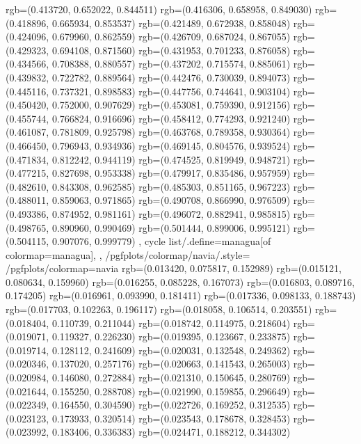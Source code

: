 {{{					rgb=(0.413720, 0.652022, 0.844511)
					rgb=(0.416306, 0.658958, 0.849030)
					rgb=(0.418896, 0.665934, 0.853537)
					rgb=(0.421489, 0.672938, 0.858048)
					rgb=(0.424096, 0.679960, 0.862559)
					rgb=(0.426709, 0.687024, 0.867055)
					rgb=(0.429323, 0.694108, 0.871560)
					rgb=(0.431953, 0.701233, 0.876058)
					rgb=(0.434566, 0.708388, 0.880557)
					rgb=(0.437202, 0.715574, 0.885061)
					rgb=(0.439832, 0.722782, 0.889564)
					rgb=(0.442476, 0.730039, 0.894073)
					rgb=(0.445116, 0.737321, 0.898583)
					rgb=(0.447756, 0.744641, 0.903104)
					rgb=(0.450420, 0.752000, 0.907629)
					rgb=(0.453081, 0.759390, 0.912156)
					rgb=(0.455744, 0.766824, 0.916696)
					rgb=(0.458412, 0.774293, 0.921240)
					rgb=(0.461087, 0.781809, 0.925798)
					rgb=(0.463768, 0.789358, 0.930364)
					rgb=(0.466450, 0.796943, 0.934936)
					rgb=(0.469145, 0.804576, 0.939524)
					rgb=(0.471834, 0.812242, 0.944119)
					rgb=(0.474525, 0.819949, 0.948721)
					rgb=(0.477215, 0.827698, 0.953338)
					rgb=(0.479917, 0.835486, 0.957959)
					rgb=(0.482610, 0.843308, 0.962585)
					rgb=(0.485303, 0.851165, 0.967223)
					rgb=(0.488011, 0.859063, 0.971865)
					rgb=(0.490708, 0.866990, 0.976509)
					rgb=(0.493386, 0.874952, 0.981161)
					rgb=(0.496072, 0.882941, 0.985815)
					rgb=(0.498765, 0.890960, 0.990469)
					rgb=(0.501444, 0.899006, 0.995121)
					rgb=(0.504115, 0.907076, 0.999779)
			},
		cycle list/.define={managua}{[of colormap=managua]},
		},
		/pgfplots/colormap/navia/.style={
			/pgfplots/colormap={navia}{%
					rgb=(0.013420, 0.075817, 0.152989)
					rgb=(0.015121, 0.080634, 0.159960)
					rgb=(0.016255, 0.085228, 0.167073)
					rgb=(0.016803, 0.089716, 0.174205)
					rgb=(0.016961, 0.093990, 0.181411)
					rgb=(0.017336, 0.098133, 0.188743)
					rgb=(0.017703, 0.102263, 0.196117)
					rgb=(0.018058, 0.106514, 0.203551)
					rgb=(0.018404, 0.110739, 0.211044)
					rgb=(0.018742, 0.114975, 0.218604)
					rgb=(0.019071, 0.119327, 0.226230)
					rgb=(0.019395, 0.123667, 0.233875)
					rgb=(0.019714, 0.128112, 0.241609)
					rgb=(0.020031, 0.132548, 0.249362)
					rgb=(0.020346, 0.137020, 0.257176)
					rgb=(0.020663, 0.141543, 0.265003)
					rgb=(0.020984, 0.146080, 0.272884)
					rgb=(0.021310, 0.150645, 0.280769)
					rgb=(0.021644, 0.155250, 0.288708)
					rgb=(0.021990, 0.159855, 0.296649)
					rgb=(0.022349, 0.164550, 0.304590)
					rgb=(0.022726, 0.169252, 0.312535)
					rgb=(0.023123, 0.173933, 0.320514)
					rgb=(0.023543, 0.178678, 0.328453)
					rgb=(0.023992, 0.183406, 0.336383)
					rgb=(0.024471, 0.188212, 0.344302)
}}}
